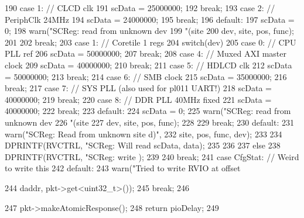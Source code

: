 \begin{DoxyCode}
{{{{{{{{{190                               case 1: // CLCD clk
191                                 scData = 25000000;
192                                 break;
193                               case 2: // PeriphClk 24MHz
194                                 scData = 24000000;
195                                 break;
196                               default:
197                                 scData = 0;
198                                 warn("SCReg: read from unknown dev %
199                                      "(site%
200                                      dev, site, pos, func);
201                             }
202                         } break;
203                         case 1: { // Coretile 1 regs
204                             switch(dev) {
205                               case 0: // CPU PLL ref
206                                 scData = 50000000;
207                                 break;
208                               case 4: // Muxed AXI master clock
209                                 scData = 40000000;
210                                 break;
211                               case 5: // HDLCD clk
212                                 scData = 50000000;
213                                 break;
214                               case 6: // SMB clock
215                                 scData = 35000000;
216                                 break;
217                               case 7: // SYS PLL (also used for pl011 UART!)
218                                 scData = 40000000;
219                                 break;
220                               case 8: // DDR PLL 40MHz fixed
221                                 scData = 40000000;
222                                 break;
223                               default:
224                                 scData = 0;
225                                 warn("SCReg: read from unknown dev %
226                                      "(site%
227                                      dev, site, pos, func);
228                             }
229                         } break;
230                         default:
231                           warn("SCReg: Read from unknown site %
      d)\n",
232                                site, pos, func, dev);
233                       }
234                       DPRINTF(RVCTRL, "SCReg: Will read %
      scData, data);
235                   }
236               }
237           } else {
238               DPRINTF(RVCTRL, "SCReg: write %
      );
239           }
240       } break;
241       case CfgStat:     // Weird to write this
242       default:
243         warn("Tried to write RVIO at offset %
      
244              daddr, pkt->get<uint32_t>());
245         break;
246     }
247     pkt->makeAtomicResponse();
248     return pioDelay;
249 }
\end{DoxyCode}


